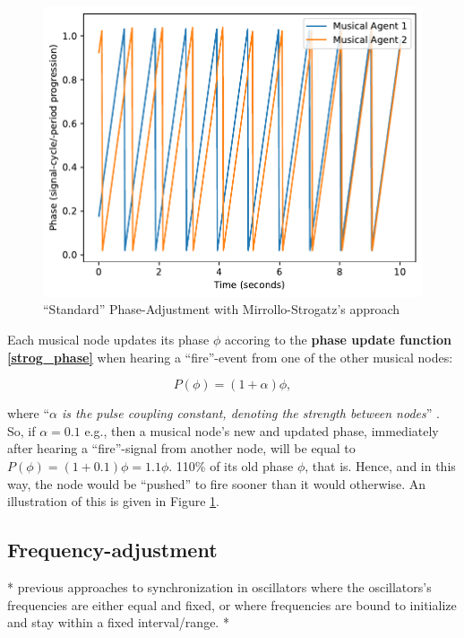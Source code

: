 		\begin{figure}[h]
			\centering
			\includegraphics[width=0.9\linewidth]{Assets/Figures/MirolloStrogatzPhaseAdjustment.pdf}
			\caption{``Standard'' Phase-Adjustment with Mirrollo-Strogatz's approach}
			\label{fig:strog_phase}
		\end{figure}
		
		Each musical node updates its phase $\phi$ accoring to the \textbf{phase update function \eqref{strog_phase}} when hearing a ``fire''-event from one of the other musical nodes:
		
		\begin{equation}\label{strog_phase}
		P(\phi) = (1 + \alpha)\phi	,
		\end{equation}
		
		where ``\textit{$\alpha$ is the pulse coupling constant, denoting the strength between nodes}'' \cite{nymoen_synch}. So, if $\alpha = 0.1$ e.g., then a musical node's new and updated phase, immediately after hearing a ``fire''-signal from another node, will be equal to $P(\phi) = (1 + 0.1)\phi = 1.1\phi$. 110\% of its old phase $\phi$, that is. Hence, and in this way, the node would be ``pushed'' to fire sooner than it would otherwise. An illustration of this is given in Figure \ref{fig:strog_phase}.
		
	\subsection{Frequency-adjustment}
	
	* previous approaches to synchronization in oscillators  where the oscillators's frequencies are either equal and fixed, or where frequencies are bound to initialize and stay within a fixed interval/range. *